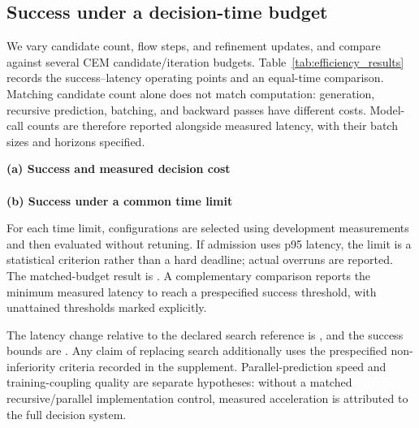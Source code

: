\subsection{Success under a decision-time budget}
\label{sec:efficiency}
We vary candidate count, flow steps, and refinement updates, and compare against several CEM candidate/iteration budgets. Table~\ref{tab:efficiency_results} records the success--latency operating points and an equal-time comparison. Matching candidate count alone does not match computation: generation, recursive prediction, batching, and backward passes have different costs. Model-call counts are therefore reported alongside measured latency, with their batch sizes and horizons specified.
\begin{table}[t]
\centering\scriptsize
\textbf{(a) Success and measured decision cost}\\[3pt]
\resizebox{0.98\textwidth}{!}{}\\[7pt]
\textbf{(b) Success under a common time limit}\\[3pt]
\resizebox{0.98\textwidth}{!}{}
\caption{Decision-budget comparison, instantiated for each task. Panel (a) retains small and large search budgets. Panel (b) selects configurations on development data under a common latency criterion and reports final success and overruns. Pending fields do not assert an achieved speedup.}
\label{tab:efficiency_results}
\end{table}
For each time limit, configurations are selected using development measurements and then evaluated without retuning. If admission uses p95 latency, the limit is a statistical criterion rather than a hard deadline; actual overruns are reported. The matched-budget result is . A complementary comparison reports the minimum measured latency to reach a prespecified success threshold, with unattained thresholds marked explicitly.

The latency change relative to the declared search reference is , and the success bounds are . Any claim of replacing search additionally uses the prespecified non-inferiority criteria recorded in the supplement. Parallel-prediction speed and training-coupling quality are separate hypotheses: without a matched recursive/parallel implementation control, measured acceleration is attributed to the full decision system.

